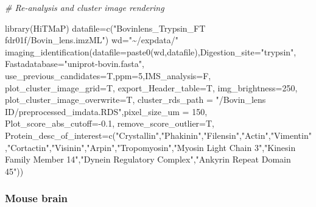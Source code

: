 \documentclass[
]{article}
\newenvironment{Shaded}{\begin{snugshade}}{\end{snugshade}}
\newcommand{\AttributeTok}[1]{\textcolor[rgb]{0.77,0.63,0.00}{#1}}
\newcommand{\CommentTok}[1]{\textcolor[rgb]{0.56,0.35,0.01}{\textit{#1}}}
\newcommand{\DecValTok}[1]{\textcolor[rgb]{0.00,0.00,0.81}{#1}}
\newcommand{\FloatTok}[1]{\textcolor[rgb]{0.00,0.00,0.81}{#1}}
\newcommand{\FunctionTok}[1]{\textcolor[rgb]{0.00,0.00,0.00}{#1}}
\newcommand{\NormalTok}[1]{#1}
\newcommand{\OtherTok}[1]{\textcolor[rgb]{0.56,0.35,0.01}{#1}}
\newcommand{\SpecialCharTok}[1]{\textcolor[rgb]{0.00,0.00,0.00}{#1}}
\newcommand{\StringTok}[1]{\textcolor[rgb]{0.31,0.60,0.02}{#1}}
\begin{document}
\begin{Shaded}
\begin{Highlighting}[]
\CommentTok{\# Re{-}analysis and cluster image rendering}

\FunctionTok{library}\NormalTok{(HiTMaP)}
\NormalTok{datafile}\OtherTok{=}\FunctionTok{c}\NormalTok{(}\StringTok{"Bovinlens\_Trypsin\_FT fdr01f/Bovin\_lens.imzML"}\NormalTok{)}
\NormalTok{wd}\OtherTok{=}\StringTok{"\textasciitilde{}/expdata/"}
\FunctionTok{imaging\_identification}\NormalTok{(}\AttributeTok{datafile=}\FunctionTok{paste0}\NormalTok{(wd,datafile),}\AttributeTok{Digestion\_site=}\StringTok{"trypsin"}\NormalTok{,}
                       \AttributeTok{Fastadatabase=}\StringTok{"uniprot{-}bovin.fasta"}\NormalTok{,}
                       \AttributeTok{use\_previous\_candidates=}\NormalTok{T,}\AttributeTok{ppm=}\DecValTok{5}\NormalTok{,}\AttributeTok{IMS\_analysis=}\NormalTok{F,}
                       \AttributeTok{plot\_cluster\_image\_grid=}\NormalTok{T,}
                       \AttributeTok{export\_Header\_table=}\NormalTok{T, }
                       \AttributeTok{img\_brightness=}\DecValTok{250}\NormalTok{, }
                       \AttributeTok{plot\_cluster\_image\_overwrite=}\NormalTok{T,}
                       \AttributeTok{cluster\_rds\_path =} \StringTok{"/Bovin\_lens ID/preprocessed\_imdata.RDS"}\NormalTok{,}\AttributeTok{pixel\_size\_um =} \DecValTok{150}\NormalTok{,}
                       \AttributeTok{Plot\_score\_abs\_cutoff=}\SpecialCharTok{{-}}\FloatTok{0.1}\NormalTok{,}
                       \AttributeTok{remove\_score\_outlier=}\NormalTok{T,}
                       \AttributeTok{Protein\_desc\_of\_interest=}\FunctionTok{c}\NormalTok{(}\StringTok{"Crystallin"}\NormalTok{,}\StringTok{"Phakinin"}\NormalTok{,}\StringTok{"Filensin"}\NormalTok{,}\StringTok{"Actin"}\NormalTok{,}\StringTok{"Vimentin"}\NormalTok{,}\StringTok{"Cortactin"}\NormalTok{,}\StringTok{"Visinin"}\NormalTok{,}\StringTok{"Arpin"}\NormalTok{,}\StringTok{"Tropomyosin"}\NormalTok{,}\StringTok{"Myosin Light Chain 3"}\NormalTok{,}\StringTok{"Kinesin Family Member 14"}\NormalTok{,}\StringTok{"Dynein Regulatory Complex"}\NormalTok{,}\StringTok{"Ankyrin Repeat Domain 45"}\NormalTok{))}
\end{Highlighting}
\end{Shaded}

\hypertarget{mouse-brain}{%
\subsubsection{Mouse brain}\label{mouse-brain}}
\end{document}
